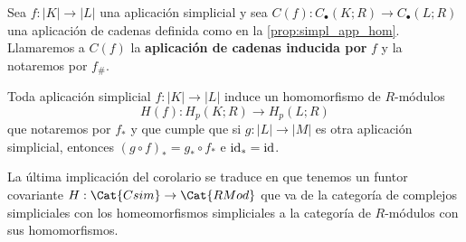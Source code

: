 \begin{definicion}
	\label{def:chain-map-ind} Sea \(f : |K| \to |L|\) una aplicación simplicial y sea
	\(C(f): C_{\bullet}(K;R) \to C_{\bullet}(L;R)\) una aplicación de cadenas definida
	como en la \autoref{prop:simpl_app_hom}. Llamaremos a \(C(f)\) la \textbf{aplicación
	de cadenas inducida por} \(f\) y la notaremos por \(f_{\#}\).
\end{definicion}

\begin{corolario}
	Toda aplicación simplicial \(f: |K| \to |L|\) induce un homomorfismo de \(R\)-módulos
	\[
		H(f) : H_{p}(K;R) \to H_{p}(L;R)
	\]
	que notaremos por \(f_{*}\) y que cumple que si \(g: |L| \to |M|\) es otra aplicación
	simplicial, entonces \((g \circ f)_{*}= g_{*} \circ f_{*}\) e \(\operatorname{id}_{*} = \operatorname{id}\).
\end{corolario}
\begin{observacion}
	La última implicación del corolario se traduce en que tenemos un funtor covariante $H: \Cat{Csim} \to \Cat{RMod}$ que va de la categoría de complejos simpliciales con los homeomorfismos simpliciales a la categoría de $R$-módulos con sus homomorfismos.
\end{observacion}

